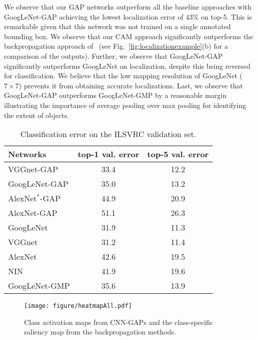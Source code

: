 \documentclass[10pt,twocolumn,letterpaper]{article}
\begin{document}
We observe that our GAP networks outperform all the baseline approaches with GoogLeNet-GAP achieving the lowest localization error of $43\%$ on top-5. This is remarkable given that this network was not trained on a single annotated bounding box. We observe that our CAM approach significantly outperforms the backpropagation approach of~\cite{simonyan2013deep} (see Fig.~\ref{fig:localizationexample}(b) for a comparison of the outputs). Further, we observe that GoogLeNet-GAP significantly outperforms GoogLeNet on localization, despite this being reversed for classification. We believe that the low mapping resolution of GoogLeNet ($7\times7$) prevents it from obtaining accurate localizations. Last, we observe that GoogLeNet-GAP outperforms GoogLeNet-GMP by a reasonable margin illustrating the importance of average pooling over max pooling for identifying the extent of objects.


















\begin{table}\caption{Classification error on the ILSVRC validation set.}
\label{network_classificationValidation}
\centering
\footnotesize
\begin{tabular}{ l | c | c }
  \hline  
  \hline                       
  Networks & top-1 val. error & top-5 val. error \\
    \hline   
VGGnet-GAP& 33.4 & 12.2 \\
GoogLeNet-GAP& 35.0 & 13.2 \\
AlexNet$^{*}$-GAP & 44.9 & 20.9 \\
AlexNet-GAP & 51.1 & 26.3 \\
\hline
  GoogLeNet & 31.9 & 11.3 \\ 
  VGGnet & 31.2 &  11.4 \\    
  AlexNet &  42.6 &  19.5  \\
    NIN & 41.9 & 19.6 \\
    \hline 
    GoogLeNet-GMP & 35.6 & 13.9 \\    
    \hline
\end{tabular}
\end{table}

\begin{figure*}
\begin{center}
\texttt{[image: figure/heatmapAll.pdf]}
\end{center}
\vspace{-4mm}
\caption{Class activation maps from CNN-GAPs and the class-specific saliency map from the backpropagation methods.}
\label{fig:activationmap}
\end{figure*}
\end{document}
